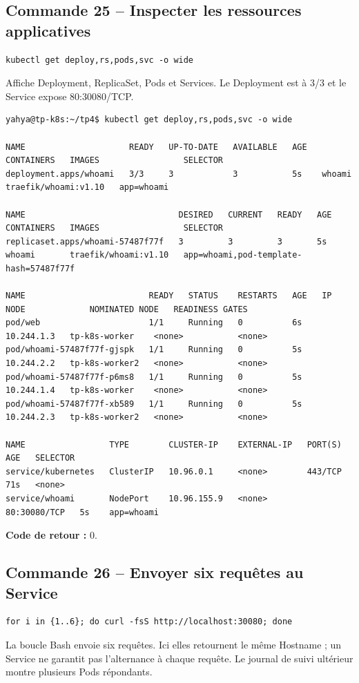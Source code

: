 \documentclass[11pt,a4paper]{article}
\begin{document}
\subsection{Commande 25 -- Inspecter les ressources applicatives}
\begin{lstlisting}
kubectl get deploy,rs,pods,svc -o wide
\end{lstlisting}
Affiche Deployment, ReplicaSet, Pods et Services. Le Deployment est à 3/3 et le Service expose 80:30080/TCP.
\begin{tcolorbox}[terminal,title={Ubuntu / WSL2 -- Commande 25 -- rendu reconstitué}]
\begin{Verbatim}[fontsize=\scriptsize,breaklines=true,breakanywhere=true,breaksymbolleft={},breaksymbolright={}]
yahya@tp-k8s:~/tp4$ kubectl get deploy,rs,pods,svc -o wide

NAME                     READY   UP-TO-DATE   AVAILABLE   AGE   CONTAINERS   IMAGES                 SELECTOR
deployment.apps/whoami   3/3     3            3           5s    whoami       traefik/whoami:v1.10   app=whoami

NAME                               DESIRED   CURRENT   READY   AGE   CONTAINERS   IMAGES                 SELECTOR
replicaset.apps/whoami-57487f77f   3         3         3       5s    whoami       traefik/whoami:v1.10   app=whoami,pod-template-hash=57487f77f

NAME                         READY   STATUS    RESTARTS   AGE   IP           NODE             NOMINATED NODE   READINESS GATES
pod/web                      1/1     Running   0          6s    10.244.1.3   tp-k8s-worker    <none>           <none>
pod/whoami-57487f77f-gjspk   1/1     Running   0          5s    10.244.2.2   tp-k8s-worker2   <none>           <none>
pod/whoami-57487f77f-p6ms8   1/1     Running   0          5s    10.244.1.4   tp-k8s-worker    <none>           <none>
pod/whoami-57487f77f-xb589   1/1     Running   0          5s    10.244.2.3   tp-k8s-worker2   <none>           <none>

NAME                 TYPE        CLUSTER-IP    EXTERNAL-IP   PORT(S)        AGE   SELECTOR
service/kubernetes   ClusterIP   10.96.0.1     <none>        443/TCP        71s   <none>
service/whoami       NodePort    10.96.155.9   <none>        80:30080/TCP   5s    app=whoami
\end{Verbatim}
\end{tcolorbox}
\textbf{Code de retour :} 0.

\subsection{Commande 26 -- Envoyer six requêtes au Service}
\begin{lstlisting}
for i in {1..6}; do curl -fsS http://localhost:30080; done
\end{lstlisting}
La boucle Bash envoie six requêtes. Ici elles retournent le même Hostname ; un Service ne garantit pas l’alternance à chaque requête. Le journal de suivi ultérieur montre plusieurs Pods répondants.
\end{document}
